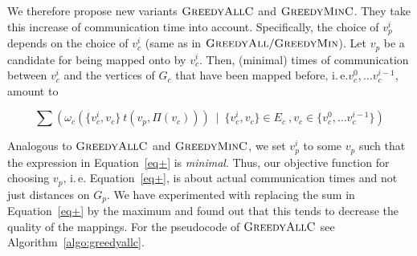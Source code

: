 \documentclass[pdftex]{llncs}
\newcommand{\ie}{i.\,e.\xspace}
\newcommand{\greedyall}{\textsc{GreedyAll}\xspace}
\newcommand{\greedyallc}{\textsc{GreedyAllC}\xspace}
\newcommand{\greedymin}{\textsc{GreedyMin}\xspace}
\newcommand{\greedyminc}{\textsc{GreedyMinC}\xspace}
\newcommand{\hmey}[1]{\textcolor{red}{[HM: #1]}\xspace}
\renewcommand{\hmey}[1]{}
\begin{document}
We therefore propose new variants $\greedyallc$ and
$\greedyminc$. They take this increase of communication time into
account. Specifically, the choice of $v^i_p$ depends on the choice of
$v^i_c$ (same as in $\greedyall\slash\greedymin$). Let
$v_p$ be a candidate for being mapped onto by $v^i_c$. Then, (minimal)
times of communication between $v^i_c$ and the vertices of $G_c$ that
have been mapped before, \ie $v^0_c, \dots v^{i-1}_c$, amount to

\begin{equation}
\label{eq+}
\sum(\omega_c(\{v^i_c, v_c\}~t(v_p, \Pi(v_c)))~\mid~\{v^i_c, v_c\}
\in E_c~,v_c \in \{v^0_c, \dots v^{i-1}_c\})
\end{equation}

Analogous to $\greedyallc$ and $\greedyminc$, we set $v^i_p$ to some
$v_p$ such that the expression in Equation~\ref{eq+} is
\emph{minimal}. Thus, our objective function for choosing $v_p$, \ie
Equation~\ref{eq+}, is about actual communication times and not just
distances on $G_p$. We have experimented with replacing the sum in
Equation~\ref{eq+} by the maximum and found out that this tends to
decrease the quality of the mappings. For the pseudocode of
$\greedyallc$ see Algorithm~\ref{algo:greedyallc}.

\hmey{Latex warning in pseudocode}
\end{document}
